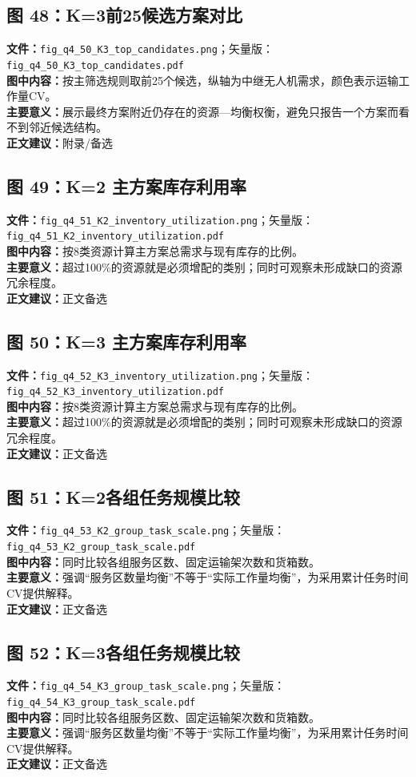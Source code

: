\subsection*{图 48：K=3前25候选方案对比}
\textbf{文件：}\texttt{fig\_q4\_50\_K3\_top\_candidates.png}；矢量版：\texttt{fig\_q4\_50\_K3\_top\_candidates.pdf}\\
\textbf{图中内容：}按主筛选规则取前25个候选，纵轴为中继无人机需求，颜色表示运输工作量CV。\\
\textbf{主要意义：}展示最终方案附近仍存在的资源—均衡权衡，避免只报告一个方案而看不到邻近候选结构。\\
\textbf{正文建议：}附录/备选

\subsection*{图 49：K=2 主方案库存利用率}
\textbf{文件：}\texttt{fig\_q4\_51\_K2\_inventory\_utilization.png}；矢量版：\texttt{fig\_q4\_51\_K2\_inventory\_utilization.pdf}\\
\textbf{图中内容：}按8类资源计算主方案总需求与现有库存的比例。\\
\textbf{主要意义：}超过100\%的资源就是必须增配的类别；同时可观察未形成缺口的资源冗余程度。\\
\textbf{正文建议：}正文备选

\subsection*{图 50：K=3 主方案库存利用率}
\textbf{文件：}\texttt{fig\_q4\_52\_K3\_inventory\_utilization.png}；矢量版：\texttt{fig\_q4\_52\_K3\_inventory\_utilization.pdf}\\
\textbf{图中内容：}按8类资源计算主方案总需求与现有库存的比例。\\
\textbf{主要意义：}超过100\%的资源就是必须增配的类别；同时可观察未形成缺口的资源冗余程度。\\
\textbf{正文建议：}正文备选

\subsection*{图 51：K=2各组任务规模比较}
\textbf{文件：}\texttt{fig\_q4\_53\_K2\_group\_task\_scale.png}；矢量版：\texttt{fig\_q4\_53\_K2\_group\_task\_scale.pdf}\\
\textbf{图中内容：}同时比较各组服务区数、固定运输架次数和货箱数。\\
\textbf{主要意义：}强调“服务区数量均衡”不等于“实际工作量均衡”，为采用累计任务时间CV提供解释。\\
\textbf{正文建议：}正文备选

\subsection*{图 52：K=3各组任务规模比较}
\textbf{文件：}\texttt{fig\_q4\_54\_K3\_group\_task\_scale.png}；矢量版：\texttt{fig\_q4\_54\_K3\_group\_task\_scale.pdf}\\
\textbf{图中内容：}同时比较各组服务区数、固定运输架次数和货箱数。\\
\textbf{主要意义：}强调“服务区数量均衡”不等于“实际工作量均衡”，为采用累计任务时间CV提供解释。\\
\textbf{正文建议：}正文备选
